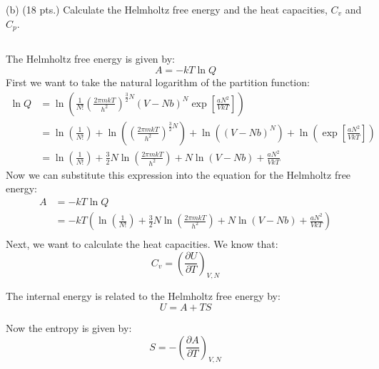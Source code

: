 \documentclass[10pt]{article}
\begin{document}
(b) (18 pts.) Calculate the Helmholtz free energy and the heat capacities, $C_{v}$ and $C_{p}$.
\subsection{}
The Helmholtz free energy is given by:
\begin{equation}
  A = - k T \ln Q
\end{equation}
First we want to take the natural logarithm of the partition function:
\begin{align}
  \ln Q &= \ln \left( \frac{1}{N !}\left(\frac{2 \pi m k T}{h^{2}}\right)^{\frac{3}{2} N}(V-N b)^{N} \exp \left[\frac{a N^{2}}{V k T}\right] \right) \\
&= \ln \left( \frac{1}{N !} \right) + \ln \left( \left(\frac{2 \pi m k T}{h^{2}}\right)^{\frac{3}{2} N} \right) + \ln \left( (V-N b)^{N} \right) + \ln \left( \exp \left[\frac{a N^{2}}{V k T}\right] \right) \\
&= \ln \left( \frac{1}{N !} \right) + \frac{3}{2} N \ln \left( \frac{2 \pi m k T}{h^{2}} \right) + N \ln \left( V-N b \right) + \frac{a N^{2}}{V k T}
\end{align}
Now we can substitute this expression into the equation for the Helmholtz free energy:
\begin{align}
  A &= - k T \ln Q \\
&= - k T \left( \ln \left( \frac{1}{N !} \right) + \frac{3}{2} N \ln \left( \frac{2 \pi m k T}{h^{2}} \right) + N \ln \left( V-N b \right) + \frac{a N^{2}}{V k T} \right) \\
\end{align}
Next, we want to calculate the heat capacities. We know that:
\begin{equation}
  C_{v} = \left( \frac{\partial U}{\partial T} \right)_{V,N}
\end{equation}


The internal energy is related to the Helmholtz free energy by:
\begin{equation}
  U = A + TS
\end{equation}

Now the entropy is given by:
\begin{equation}
  S = - \left( \frac{\partial A}{\partial T} \right)_{V,N}
\end{equation}
\end{document}
